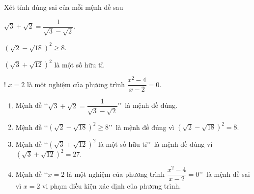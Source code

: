 \begin{bt}%
	Xét tính đúng sai của mỗi mệnh đề sau
	\begin{listEX}[3]
		\item $\sqrt{3}+\sqrt{2}=\dfrac{1}{\sqrt{3}-\sqrt{2}}$.
		\item $\left(\sqrt{2}-\sqrt{18}\right)^2\geqslant8$.
		\item $\left(\sqrt{3}+\sqrt{12}\right)^2$ là một số hữu tỉ.
		\item! $x=2$ là một nghiệm của phương trình $\dfrac{x^2-4}{x-2}=0$.
	\end{listEX}
	\loigiai
	{
		\begin{enumerate}
			\item Mệnh đề \lq\lq  $\sqrt{3}+\sqrt{2}=\dfrac{1}{\sqrt{3}-\sqrt{2}}$\rq\rq\ là mệnh đề đúng.
			\item Mệnh đề \lq\lq  $\left(\sqrt{2}-\sqrt{18}\right)^2\geqslant8$\rq\rq\ là mệnh đề đúng vì $\left(\sqrt{2}-\sqrt{18}\right)^2=8$.
			\item Mệnh đề \lq\lq  $\left(\sqrt{3}+\sqrt{12}\right)^2$ là một số hữu tỉ\rq\rq\ là mệnh đề đúng vì $\left(\sqrt{3}+\sqrt{12}\right)^2=27$.
			\item Mệnh đề \lq\lq  $x=2$ là một nghiệm của phương trình $\dfrac{x^2-4}{x-2}=0$\rq\rq\ là mệnh đề sai vì $x=2$ vi phạm điều kiện xác định của phương trình.
		\end{enumerate}
	}
\end{bt}

